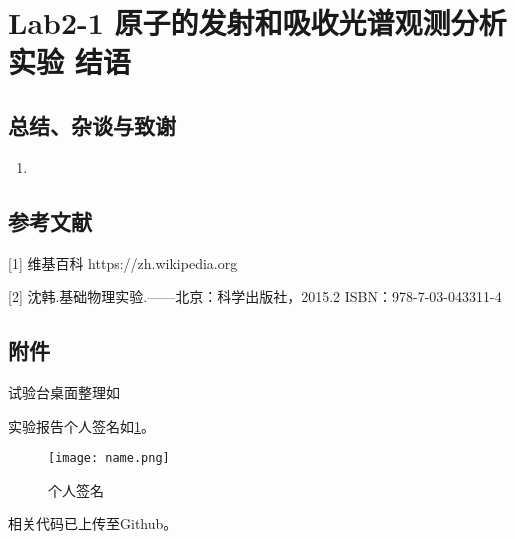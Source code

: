 \documentclass[dvipsnames, svgnames,a4paper,11pt]{article}
\begin{document}
	\section{Lab2-1 原子的发射和吸收光谱观测分析实验 \quad\heiti 结语}
	
	\subsection{总结、杂谈与致谢}
	\begin{enumerate}
		\item 
	\end{enumerate}
	
	\subsection{参考文献}
	[1] 维基百科 https://zh.wikipedia.org
	
	[2] 沈韩.基础物理实验.——北京：科学出版社，2015.2 ISBN：978-7-03-043311-4
	
	
	\subsection{附件}
	试验台桌面整理如%
	
	实验报告个人签名如\cref{fig:name}。
	
	\begin{figure}[htbp]
		\centering
		\texttt{[image: name.png]}
		\caption{个人签名}
		\label{fig:name}
	\end{figure}
	
	
	相关代码已上传至Github。
	
	
	
\end{document}
